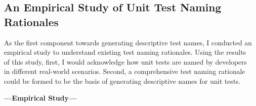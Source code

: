 \subsection{An Empirical Study of Unit Test Naming Rationales}
\label{sec:emp-study}

As the first component towards generating descriptive test names, I conducted an empirical study to understand existing test naming rationales.
%
Using the results of this study, first, I would acknowledge how unit tests are named by developers in different real-world scenarios.
%
Second, a comprehensive test naming rationale could be formed to be the basis of generating descriptive names for unit tests.

\textbf{---Empirical Study---}